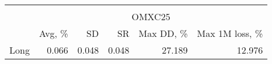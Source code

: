 \begin{tabular}{lrrrrr}
\hline \hline \\ [-1.8ex]
 & \multicolumn{5}{c}{OMXC25} \\
 \cmidrule(lr){2-6}
  & Avg, \% & SD & SR & Max DD, \% & Max 1M loss, \% \\
\midrule
Long & 0.066 & 0.048 & 0.048 & 27.189 & 12.976 \\
\hline \hline
\end{tabular}